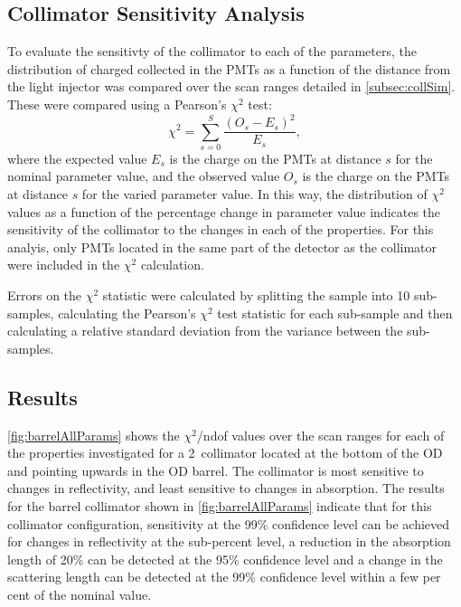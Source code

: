 \documentclass[a4paper,11pt]{article}
\begin{document}
\subsection{Collimator Sensitivity Analysis}\label{subsec:collAnalysis}

To evaluate the sensitivty of the collimator to each of the parameters, the distribution of charged collected in the PMTs as a function of the distance from the light injector was compared over the scan ranges detailed in \cref{subsec:collSim}. These were compared using a Pearson's $\chi^2$ test:
\begin{equation}
	\chi ^2 = \sum^S_{s=0}\frac{(O_s-E_s)^2}{E_s},
\end{equation}
where the expected value $E_s$ is the charge on the PMTs at distance $s$ for the nominal parameter value, and the observed value $O_s$ is the charge on the PMTs at distance $s$ for the  varied parameter value. In this way, the distribution of $\chi^2$ values as a function of the percentage change in parameter value indicates the sensitivity of the collimator to the changes in each of the properties. For this analyis, only PMTs located in the same part of the detector as the collimator were included in the $\chi^2$ calculation.

Errors on the $\chi^2$ statistic were calculated by splitting the sample into 10 sub-samples, calculating the Pearson’s $\chi^2$ test statistic for each sub-sample and then calculating a relative standard deviation from the variance between the sub-samples.


\subsection{Results}\label{subsec:collResults}

\cref{fig:barrelAllParams} shows the $\chi^2$/ndof values over the scan ranges for each of the properties investigated for a 2\textdegree~collimator located at the bottom of the OD and pointing upwards in the OD barrel. The collimator is most sensitive to changes in reflectivity, and least sensitive to changes in absorption. The results for the barrel collimator shown in \cref{fig:barrelAllParams} indicate that for this collimator configuration, sensitivity at the 99\% confidence level can be achieved for changes in reflectivity at the sub-percent level, a reduction in the absorption length of 20\% can be detected at the 95\% confidence level and a change in the scattering length can be detected at the 99\% confidence level within a few per cent of the nominal value.
\end{document}
